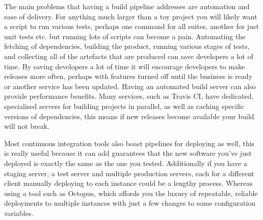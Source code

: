 The main problems that having a build pipeline addresses are automation and ease of delivery.
For anything much larger than a toy project you will likely want a script to run various tests,
perhaps one command for all suites, another for just unit tests etc. but running lots of scripts can become a pain.
Automating the fetching of dependencies, building the product, running various stages of tests, and collecting all of the artefacts that are produced can save developers a lot of time.
By saving developers a lot of time it will encourage developers to make releases more often,
perhaps with features turned off until the business is ready or another service has been updated.
Having an automated build server can also provide performance benefits.
Many services, such as Travis CI, have dedicated, specialised servers for building projects in parallel,
as well as caching specific versions of dependencies,
this means if new releases become available your build will not break.
\par
Most continuous integration tools also boast pipelines for deploying as well,
this is really useful because it can add guarantees that the new software you've just deployed is exactly the same as the one you tested.
Additionally if you have a staging server, a test server and multiple production servers,
each for a different client manually deploying to each instance could be a lengthy process.
Whereas using a tool such as Octopus, which affords you the luxury of repeatable,
reliable deployments to multiple instances with just a few changes to some configuration variables.

